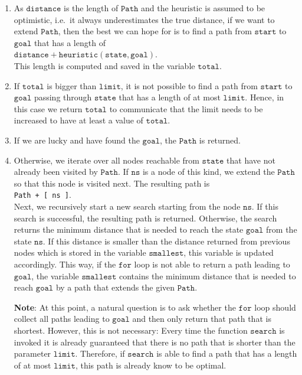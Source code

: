 \begin{enumerate}
\item As $\mathtt{distance}$ is the length of $\mathtt{Path}$ and the $\mathrm{heuristic}$ is assumed to be optimistic,
      i.e.~it always underestimates the true distance, if we want to extend $\mathtt{Path}$, then the best we
      can hope for is to find a path from $\mathtt{start}$ to $\mathtt{goal}$ that has a length of
      \\[0.2cm]
      \hspace*{1.3cm}
      $\mathtt{distance} + \mathtt{heuristic}(\mathtt{state}, \mathtt{goal})$.
      \\[0.2cm]
      This length is computed and saved in the variable $\mathtt{total}$.
\item If $\mathtt{total}$ is bigger than $\mathtt{limit}$, it is not possible to find a path from
      $\mathtt{start}$ to $\mathtt{goal}$ passing through $\mathtt{state}$ that has a length of at most
      $\mathtt{limit}$.  Hence, in this case we return $\mathtt{total}$ to communicate that the limit needs to
      be increased to have at least a value of $\mathtt{total}$.
\item If we are lucky and have found the $\mathtt{goal}$, the $\mathtt{Path}$ is returned.
\item Otherwise, we iterate over all nodes reachable from $\mathtt{state}$ that have not already been visited
      by $\mathtt{Path}$.  If $\mathtt{ns}$ is a node of this kind, we extend the $\mathtt{Path}$ so that
      this node is visited next.  The resulting path is 
      \\[0.2cm]
      \hspace*{1.3cm}
      \texttt{Path + [ ns ]}.
      \\[0.2cm]
      Next, we recursively start a new search starting from the node $\mathtt{ns}$.  If this search is
      successful, the resulting path is returned.  Otherwise, the search returns the minimum distance that is
      needed to reach the state $\mathtt{goal}$ from the state $\mathtt{ns}$.  If this distance is smaller than
      the distance returned from previous nodes which is stored in the variable $\mathtt{smallest}$, this
      variable is updated accordingly.  This way, if the $\mathtt{for}$ loop is not able to return a path
      leading to $\mathtt{goal}$, the variable $\mathtt{smallest}$ contains the minimum distance that is needed
      to reach $\mathtt{goal}$ by a path that extends the given $\mathtt{Path}$.
      
      \textbf{Note}: At this point, a natural question is to ask whether the $\mathtt{for}$ loop should collect
      all paths leading to $\mathtt{goal}$ and then only return that path that is shortest.  However, this is
      not necessary:  Every time the function $\mathtt{search}$ is invoked it is already guaranteed that there
      is no path that is shorter than the parameter $\mathtt{limit}$.  Therefore, if $\mathtt{search}$ is able
      to find a path that has a length of at most $\mathtt{limit}$, this path is already know to be optimal.
\end{enumerate}
